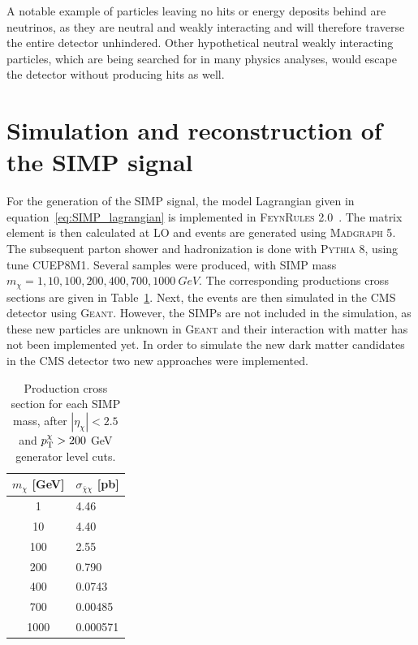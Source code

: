 A notable example of particles leaving no hits or energy deposits behind are neutrinos, as they are neutral and weakly interacting and will therefore traverse the entire detector unhindered. Other hypothetical neutral weakly interacting particles, which are being searched for in many physics analyses, would escape the detector without producing hits as well.

\section{Simulation and reconstruction of the SIMP signal}
\label{sec:SIMPs}



For the generation of the \ac{SIMP} signal, the model Lagrangian given in equation~\ref{eq:SIMP_lagrangian} is implemented in \textsc{FeynRules 2.0}~\cite{Alloul:2013bka}. The matrix element is then calculated at \ac{LO} and events are generated using \textsc{Madgraph 5}. The subsequent parton shower and hadronization is done with \textsc{Pythia 8}, using tune CUEP8M1. Several samples were produced, with \ac{SIMP} mass $m_{\chi} = 1, 10, 100, 200, 400, 700, \SI{1000}{GeV}$. The corresponding productions cross sections are given in Table~\ref{tab:signal_samples}. Next, the events are then simulated in the \ac{CMS} detector using \textsc{Geant}. However, the \acp{SIMP} are not included in the simulation, as these new particles are unknown in \textsc{Geant} and their interaction with matter has not been implemented yet. In order to simulate the new dark matter candidates in the \ac{CMS} detector two new approaches were implemented.

\begin{table}[ht]
  \centering
\begin{tabular}{| c | l |}
\hline
$m_\chi$ [GeV] & $\sigma_{\bar{\chi}\chi}$ [pb] \\
\hline
    1 &  4.46 \\
  10 &   4.40  \\
  100 &  2.55  \\
  200 &   0.790  \\
  400 &   0.0743   \\
  700 &   0.00485  \\
1000 &   0.000571  \\
\hline
\end{tabular}
\caption{Production cross section for each \ac{SIMP} mass, after $|\eta_{\chi}| < 2.5$ and $p_{\rm T}^{\chi} > 200$ GeV generator level cuts.}
\label{tab:signal_samples}
\end{table}

